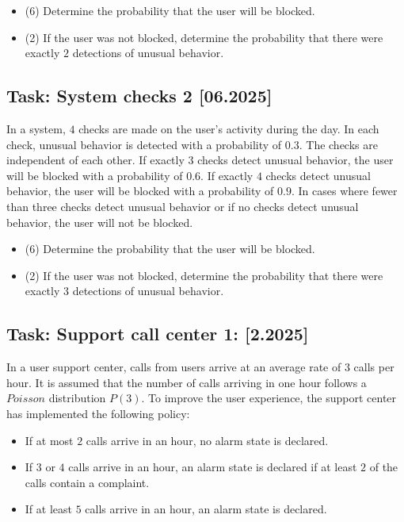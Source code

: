 \documentclass[a4paper, 12pt]{article}
\begin{document}
\begin{itemize}
    \item [a)] (6) Determine the probability that the user will be blocked.
    \item [b)] (2) If the user was not blocked, determine the probability that there were exactly $2$ detections of unusual behavior.
\end{itemize}


\subsection*{Task: System checks 2 [06.2025]}


In a system, $4$ checks are made on the user's activity during the day. In each check, unusual behavior is detected with a probability of $0.3$. The checks are independent of each other. If exactly $3$ checks detect unusual behavior, the user will be blocked with a probability of $0.6$. If exactly $4$ checks detect unusual behavior, the user will be blocked with a probability of $0.9$. In cases where fewer than three checks detect unusual behavior or if no checks detect unusual behavior, the user will not be blocked.

\begin{itemize}
    \item [a)] (6) Determine the probability that the user will be blocked.
    \item [b)] (2) If the user was not blocked, determine the probability that there were exactly $3$ detections of unusual behavior.
\end{itemize}


\subsection*{Task: Support call center 1: [2.2025]}

In a user support center, calls from users arrive at an average rate of $3$ calls per hour. It is assumed that the number of calls arriving in one hour follows a $Poisson$ distribution $P(3)$. To improve the user experience, the support center has implemented the following policy:

\begin{itemize}
    \item If at most $2$ calls arrive in an hour, no alarm state is declared.

\item If $3$ or $4$ calls arrive in an hour, an alarm state is declared if at least $2$ of the calls contain a complaint.

\item If at least $5$ calls arrive in an hour, an alarm state is declared.

\end{itemize}
\end{document}
